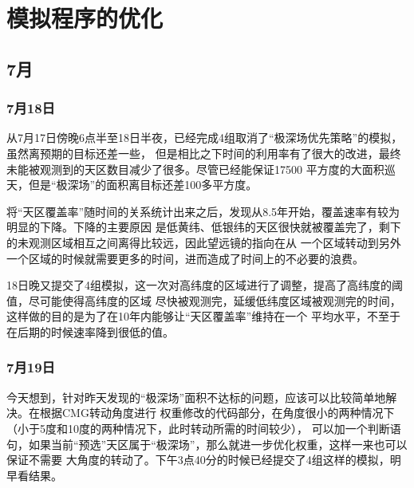 
\chapter{模拟程序的优化}

\section{7月}


\subsection{7月18日}



从7月17日傍晚6点半至18日半夜，已经完成4组取消了“极深场优先策略”的模拟，虽然离预期的目标还差一些，
但是相比之下时间的利用率有了很大的改进，最终未能被观测到的天区数目减少了很多。尽管已经能保证17500
平方度的大面积巡天，但是“极深场”的面积离目标还差100多平方度。

将“天区覆盖率”随时间的关系统计出来之后，发现从8.5年开始，覆盖速率有较为明显的下降。下降的主要原因
是低黄纬、低银纬的天区很快就被覆盖完了，剩下的未观测区域相互之间离得比较远，因此望远镜的指向在从
一个区域转动到另外一个区域的时候就需要更多的时间，进而造成了时间上的不必要的浪费。

18日晚又提交了4组模拟，这一次对高纬度的区域进行了调整，提高了高纬度的阈值，尽可能使得高纬度的区域
尽快被观测完，延缓低纬度区域被观测完的时间，这样做的目的是为了在10年内能够让“天区覆盖率”维持在一个
平均水平，不至于在后期的时候速率降到很低的值。

\subsection{7月19日}
今天想到，针对昨天发现的“极深场”面积不达标的问题，应该可以比较简单地解决。在根据CMG转动角度进行
权重修改的代码部分，在角度很小的两种情况下（小于5度和10度的两种情况下，此时转动所需的时间较少），
可以加一个判断语句，如果当前“预选”天区属于“极深场”，那么就进一步优化权重，这样一来也可以保证不需要
大角度的转动了。下午3点40分的时候已经提交了4组这样的模拟，明早看结果。

